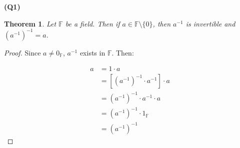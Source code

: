 \documentclass[12pt, a4paper]{article}
\newtheorem*{theorem}{Theorem}
\newcommand{\F}{\mathbb{F}}
\begin{document}
\textbf{(Q1)}
\begin{theorem}
    Let $\F$ be a field. Then if $a \in \F \setminus \{0\}$, then
    $a^{-1}$ is invertible and $(a^{-1})^{-1} = a$.
\end{theorem}

\begin{proof}
    Since $a \neq 0_{\F}$, $a^{-1}$ exists in $\F$. Then:

    \begin{align*}
        a & = 1 \cdot a\\
        & = [(a^{-1})^{-1} \cdot a^{-1}] \cdot a\\
        & = (a^{-1})^{-1} \cdot a^{-1} \cdot a\\
        & = (a^{-1})^{-1} \cdot 1_{\F}\\
        & = (a^{-1})^{-1}
    \end{align*}
\end{proof}
\end{document}
